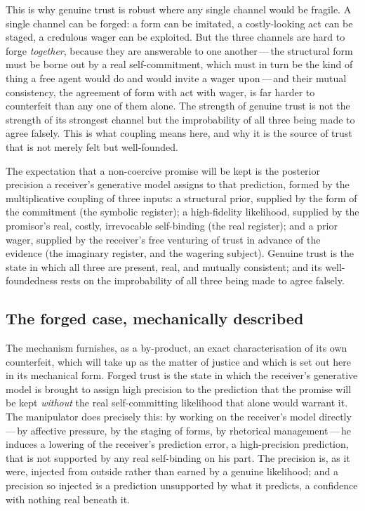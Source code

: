 This is why genuine trust is robust where any single channel would be fragile. A single channel can be forged: a form can be imitated, a costly-looking act can be staged, a credulous wager can be exploited. But the three channels are hard to forge \emph{together}, because they are answerable to one another\,---\,the structural form must be borne out by a real self-commitment, which must in turn be the kind of thing a free agent would do and would invite a wager upon\,---\,and their mutual consistency, the agreement of form with act with wager, is far harder to counterfeit than any one of them alone. The strength of genuine trust is not the strength of its strongest channel but the improbability of all three being made to agree falsely. This is what coupling means here, and why it is the source of trust that is not merely felt but well-founded.

\begin{claim}
The expectation that a non-coercive promise will be kept is the posterior precision a receiver's generative model assigns to that prediction, formed by the multiplicative coupling of three inputs: a structural prior, supplied by the form of the commitment (the symbolic register); a high-fidelity likelihood, supplied by the promisor's real, costly, irrevocable self-binding (the real register); and a prior wager, supplied by the receiver's free venturing of trust in advance of the evidence (the imaginary register, and the wagering subject). Genuine trust is the state in which all three are present, real, and mutually consistent; and its well-foundedness rests on the improbability of all three being made to agree falsely.
\end{claim}

\subsection{The forged case, mechanically described}
\label{p13:sub:mech-forged}

The mechanism furnishes, as a by-product, an exact characterisation of its own counterfeit, which  will take up as the matter of justice and which is set out here in its mechanical form. Forged trust is the state in which the receiver's generative model is brought to assign high precision to the prediction that the promise will be kept \emph{without} the real self-committing likelihood that alone would warrant it. The manipulator does precisely this: by working on the receiver's model directly\,---\,by affective pressure, by the staging of forms, by rhetorical management\,---\,he induces a lowering of the receiver's prediction error, a high-precision prediction, that is not supported by any real self-binding on his part. The precision is, as it were, injected from outside rather than earned by a genuine likelihood; and a precision so injected is a prediction unsupported by what it predicts, a confidence with nothing real beneath it.

